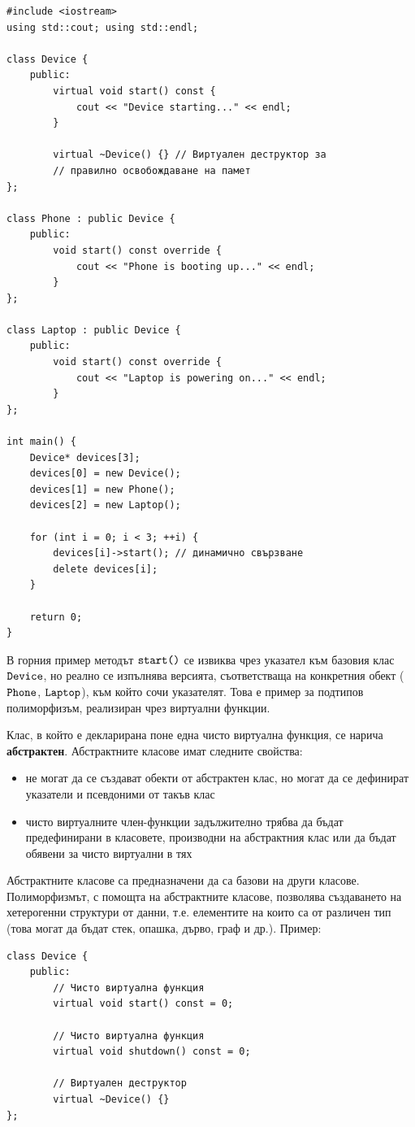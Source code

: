 \documentclass{article}
\begin{document}
\begin{lstlisting}[style=cpp]
#include <iostream>
using std::cout; using std::endl;

class Device {
    public:
        virtual void start() const {
            cout << "Device starting..." << endl;
        }

        virtual ~Device() {} // Виртуален деструктор за
        // правилно освобождаване на памет
};

class Phone : public Device {
    public:
        void start() const override {
            cout << "Phone is booting up..." << endl;
        }
};

class Laptop : public Device {
    public:
        void start() const override {
            cout << "Laptop is powering on..." << endl;
        }
};

int main() {
    Device* devices[3];
    devices[0] = new Device();
    devices[1] = new Phone();
    devices[2] = new Laptop();

    for (int i = 0; i < 3; ++i) {
        devices[i]->start(); // динамично свързване
        delete devices[i];
    }

    return 0;
}
\end{lstlisting}

В горния пример методът $\textcolor{black}{\texttt{start()}}$ се извиква чрез указател към базовия клас $\textcolor{black}{\texttt{Device}}$, но реално се изпълнява версията, съответстваща
на конкретния обект ($\textcolor{black}{\texttt{Phone}}$, $\textcolor{black}{\texttt{Laptop}}$), към който сочи указателят. Това е пример за подтипов полиморфизъм, реализиран чрез виртуални функции.

Клас, в който е декларирана поне една чисто виртуална функция, се нарича \textbf{абстрактен}. Абстрактните класове имат следните
свойства:
\begin{itemize}
    \item не могат да се създават обекти от абстрактен клас, но могат да се дефинират указатели и псевдоними от такъв клас
    \item чисто виртуалните член-функции задължително трябва да бъдат предефинирани в класовете, производни на абстрактния клас
    или да бъдат обявени за чисто виртуални в тях
\end{itemize}
Абстрактните класове са предназначени да са базови на други класове. Полиморфизмът, с помощта на абстрактните класове, позволява
създаването на хетерогенни структури от данни, т.е. елементите на които са от различен тип (това могат да бъдат стек, опашка,
дърво, граф и др.). \newline\newline
Пример:
\begin{lstlisting}[style=cpp]
class Device {
    public:
        // Чисто виртуална функция
        virtual void start() const = 0;

        // Чисто виртуална функция
        virtual void shutdown() const = 0;

        // Виртуален деструктор
        virtual ~Device() {}
};
\end{lstlisting}
\end{document}
